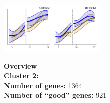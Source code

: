 \begin{multicols}{2}
\includegraphics[width=2in]{figures/clusters/leaf_Preflowering_1.png}
\columnbreak

\noindent \textbf{Overview}\\\textbf{Cluster 2:}  \\
\textbf{Number of genes:} 1364 \\
\textbf{Number of ``good'' genes:} 921 \\
\end{multicols}


